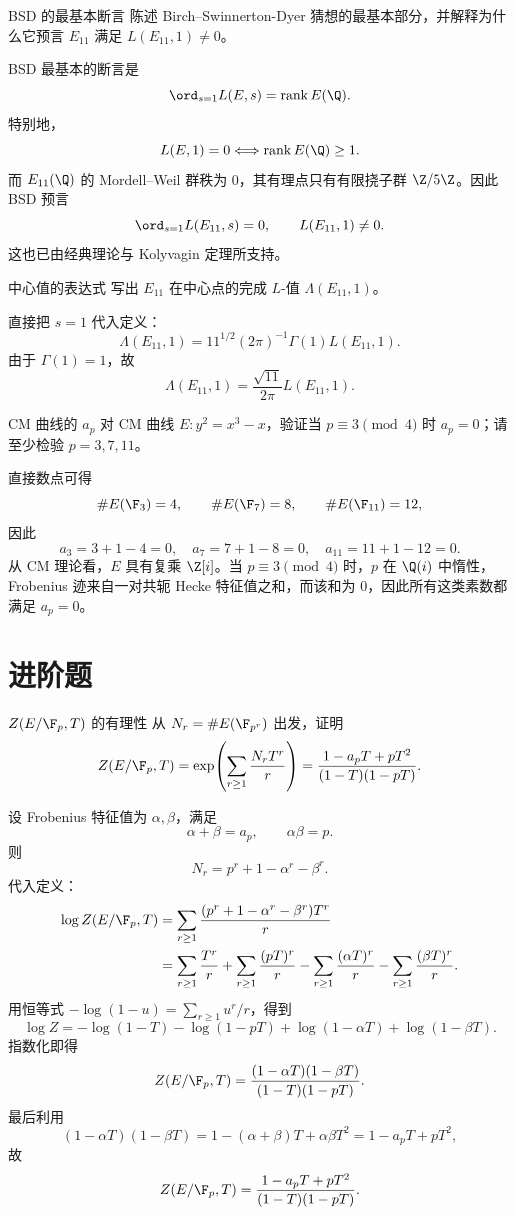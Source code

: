 \begin{problem}{BSD 的最基本断言 \easy}
陈述 Birch--Swinnerton-Dyer 猜想的最基本部分，并解释为什么它预言 $E_{11}$ 满足 $L(E_{11},1)\neq 0$。
\end{problem}
\begin{solution}
BSD 最基本的断言是
\[
\ord_{s=1}L(E,s)=\mathrm{rank}\,E(\Q).
\]
特别地，
\[
L(E,1)=0
\Longleftrightarrow
\mathrm{rank}\,E(\Q)\ge 1.
\]
而 $E_{11}(\Q)$ 的 Mordell--Weil 群秩为 $0$，其有理点只有有限挠子群 $\Z/5\Z$。因此 BSD 预言
\[
\ord_{s=1}L(E_{11},s)=0,
\qquad
L(E_{11},1)\neq 0.
\]
这也已由经典理论与 Kolyvagin 定理所支持。
\end{solution}

\begin{problem}{中心值的表达式 \easy}
写出 $E_{11}$ 在中心点的完成 $L$-值 $\Lambda(E_{11},1)$。
\end{problem}
\begin{solution}
直接把 $s=1$ 代入定义：
\[
\Lambda(E_{11},1)=11^{1/2}(2\pi)^{-1}\Gamma(1)L(E_{11},1).
\]
由于 $\Gamma(1)=1$，故
\[
\Lambda(E_{11},1)=\frac{\sqrt{11}}{2\pi}L(E_{11},1).
\]
\end{solution}

\begin{problem}{CM 曲线的 $a_p$ \easy}
对 CM 曲线 $E:y^2=x^3-x$，验证当 $p\equiv 3\pmod 4$ 时 $a_p=0$；请至少检验 $p=3,7,11$。
\end{problem}
\begin{solution}
直接数点可得
\[
\#E(\F_3)=4,
\qquad
\#E(\F_7)=8,
\qquad
\#E(\F_{11})=12,
\]
因此
\[
a_3=3+1-4=0,
\quad
 a_7=7+1-8=0,
\quad
 a_{11}=11+1-12=0.
\]
从 CM 理论看，$E$ 具有复乘 $\Z[i]$。当 $p\equiv 3\pmod 4$ 时，$p$ 在 $\Q(i)$ 中惰性，Frobenius 迹来自一对共轭 Hecke 特征值之和，而该和为 $0$，因此所有这类素数都满足 $a_p=0$。
\end{solution}

\section*{进阶题}

\begin{problem}{$Z(E/\F_p,T)$ 的有理性 \medium}
从 $N_r=\#E(\F_{p^r})$ 出发，证明
\[
Z(E/\F_p,T)=\exp\!\left(\sum_{r\ge 1}\frac{N_rT^r}{r}\right)
=\frac{1-a_pT+pT^2}{(1-T)(1-pT)}.
\]
\end{problem}
\begin{solution}
设 Frobenius 特征值为 $\alpha,\beta$，满足
\[
\alpha+\beta=a_p,
\qquad
\alpha\beta=p.
\]
则
\[
N_r=p^r+1-\alpha^r-\beta^r.
\]
代入定义：
\begin{align*}
\log Z(E/\F_p,T)
&=\sum_{r\ge1}\frac{(p^r+1-\alpha^r-\beta^r)T^r}{r}\\
&=\sum_{r\ge1}\frac{T^r}{r}+\sum_{r\ge1}\frac{(pT)^r}{r}-\sum_{r\ge1}\frac{(\alpha T)^r}{r}-\sum_{r\ge1}\frac{(\beta T)^r}{r}.
\end{align*}
用恒等式 $-\log(1-u)=\sum_{r\ge1}u^r/r$，得到
\[
\log Z=-\log(1-T)-\log(1-pT)+\log(1-\alpha T)+\log(1-\beta T).
\]
指数化即得
\[
Z(E/\F_p,T)=\frac{(1-\alpha T)(1-\beta T)}{(1-T)(1-pT)}.
\]
最后利用
\[
(1-\alpha T)(1-\beta T)=1-(\alpha+\beta)T+\alpha\beta T^2=1-a_pT+pT^2,
\]
故
\[
Z(E/\F_p,T)=\frac{1-a_pT+pT^2}{(1-T)(1-pT)}.
\]
\end{solution}

